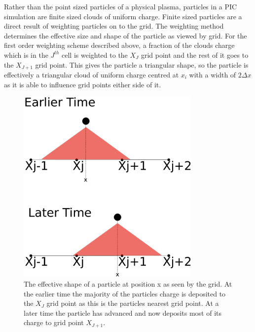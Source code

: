 Rather than the point sized particles of a physical plasma, particles in a PIC simulation are finite sized clouds of uniform charge. Finite sized particles are a direct result of weighting particles on to the grid. The weighting method determines the effective size and shape of the particle as viewed by grid. For the first order weighting scheme described above, a fraction of the clouds charge which is in the $J^{th}$ cell is weighted to the $X_J$ grid point and the rest of it goes to the $X_{J+1}$ grid point. This gives the particle a triangular shape, so the particle is effectively a triangular cloud of uniform charge centred at $x_i$ with a width of $2\Delta x$ as it is able to influence grid points either side of it.
\begin{figure}[H]
\centering
\includegraphics[width=0.8\textwidth]{triangle.pdf}
\caption{The effective shape of a particle at position x as seen by the grid. At the earlier time the majority of the particles charge is deposited to the $X_J$ grid point as this is the particles nearest grid point. At a later time the particle has advanced and now deposits most of its charge to grid point $X_{J+1}$.}
\label{fig:shape}
\end{figure} 
 
